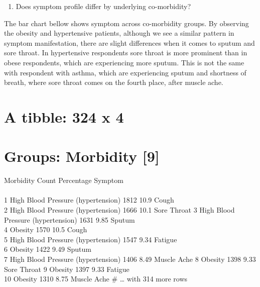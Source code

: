 \documentclass[
]{article}
\providecommand{\tightlist}{%
  \setlength{\itemsep}{0pt}\setlength{\parskip}{0pt}}
\begin{document}
\begin{enumerate}
\def\labelenumi{\arabic{enumi}.}
\setcounter{enumi}{1}
\tightlist
\item
  Does symptom profile differ by underlying co-morbidity?
\end{enumerate}

The bar chart bellow shows symptom across co-morbidity groups. By
observing the obesity and hypertensive patients, although we see a
similar pattern in symptom manifestation, there are slight differences
when it comes to sputum and sore throat. In hypertensive respondents
sore throat is more prominent than in obese respondents, which are
experiencing more sputum. This is not the same with respondent with
asthma, which are experiencing sputum and shortness of breath, where
sore throat comes on the fourth place, after muscle ache.

\hypertarget{htmlwidget-b4c367d754945f74ab3a}{}
\begin{plotly}

\end{plotly}

\hypertarget{a-tibble-324-x-4}{%
\section{A tibble: 324 x 4}\label{a-tibble-324-x-4}}

\hypertarget{groups-morbidity-9}{%
\section{Groups: Morbidity {[}9{]}}\label{groups-morbidity-9}}

Morbidity Count Percentage Symptom\\
~\\
1 High Blood Pressure (hypertension) 1812 10.9 Cough\\
2 High Blood Pressure (hypertension) 1666 10.1 Sore Throat 3 High Blood
Pressure (hypertension) 1631 9.85 Sputum\\
4 Obesity 1570 10.5 Cough\\
5 High Blood Pressure (hypertension) 1547 9.34 Fatigue\\
6 Obesity 1422 9.49 Sputum\\
7 High Blood Pressure (hypertension) 1406 8.49 Muscle Ache 8 Obesity
1398 9.33 Sore Throat 9 Obesity 1397 9.33 Fatigue\\
10 Obesity 1310 8.75 Muscle Ache \# \ldots{} with 314 more rows

\hypertarget{htmlwidget-38330dde85c705e7f02b}{}
\begin{plotly}

\end{plotly}
\end{document}
